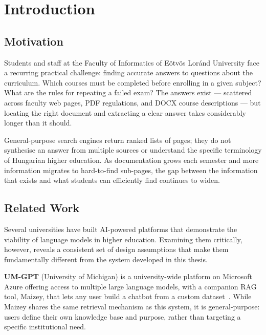 \chapter{Introduction}
\label{ch:intro}

\section{Motivation}
\label{sec:intro-motivation}

Students and staff at the Faculty of Informatics of Eötvös Loránd University
face a recurring practical challenge: finding accurate answers to questions
about the curriculum. Which courses must be completed before enrolling in a
given subject? What are the rules for repeating a failed exam? The answers
exist --- scattered across faculty web pages, PDF regulations, and DOCX course
descriptions --- but locating the right document and extracting a clear answer
takes considerably longer than it should.

General-purpose search engines return ranked lists of pages; they do not
synthesise an answer from multiple sources or understand the specific
terminology of Hungarian higher education. As documentation grows each
semester and more information migrates to hard-to-find sub-pages, the gap
between the information that exists and what students can efficiently find
continues to widen.

\section{Related Work}
\label{sec:intro-related}

Several universities have built AI-powered platforms that demonstrate the
viability of language models in higher education. Examining them critically,
however, reveals a consistent set of design assumptions that make them
fundamentally different from the system developed in this thesis.

\textbf{UM-GPT} (University of Michigan) is a university-wide platform on
Microsoft Azure offering access to multiple large language models, with a
companion RAG tool, Maizey, that lets any user build a chatbot from a custom
dataset~\cite{umich_genai}. While Maizey shares the same retrieval mechanism
as this system, it is general-purpose: users define their own knowledge base
and purpose, rather than targeting a specific institutional need.

